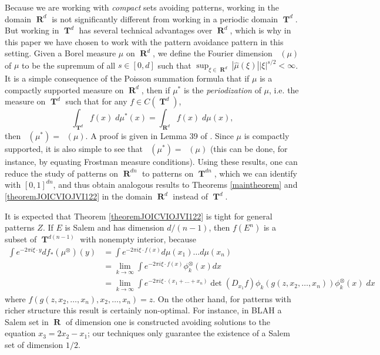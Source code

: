 \documentclass[12pt,reqno]{article}
\numberwithin{equation}{section}
\DeclareMathOperator{\hausdim}{\dim_{\mathbf{H}}}
\DeclareMathOperator{\fordim}{\dim_{\mathbf{F}}}
\DeclareMathOperator{\RR}{\mathbf{R}}
\DeclareMathOperator{\TT}{\mathbf{T}}
\numberwithin{theorem}{section}
\begin{document}
Because we are working with \emph{compact} sets avoiding patterns, working in the domain $\RR^d$ is not significantly different from working in a periodic domain $\TT^d$. But working in $\TT^d$ has several technical advantages over $\RR^d$, which is why in this paper we have chosen to work with the pattern avoidance pattern in this setting. Given a Borel measure $\mu$ on $\RR^d$, we define the Fourier dimension $\fordim(\mu)$ of $\mu$ to be the supremum of all $s \in [0,d]$ such that $\sup_{\xi \in \RR^d} |\widehat{\mu}(\xi)| |\xi|^{s/2} < \infty$. It is a simple consequence of the Poisson summation formula that if $\mu$ is a compactly supported measure on $\RR^d$, then if $\mu^*$ is the \emph{periodization} of $\mu$, i.e. the measure on $\TT^d$ such that for any $f \in C(\TT^d)$,
%
\begin{equation}
    \int_{\TT^d} f(x)\; d\mu^*(x) = \int_{\RR^d} f(x)\; d\mu(x),
\end{equation}
%
then $\fordim(\mu^*) = \fordim(\mu)$. A proof is given in Lemma 39 of \cite{myThesis}. Since $\mu$ is compactly supported, it is also simple to see that $\hausdim(\mu^*) = \hausdim(\mu)$ (this can be done, for instance, by equating Frostman measure conditions). Using these results, one can reduce the study of patterns on $\RR^{dn}$ to patterns on $\TT^{dn}$, which we can identify with $[0,1]^{dn}$, and thus obtain analogous results to Theorems \ref{maintheorem} and \ref{theoremJOICVIOJVI122} in the domain $\RR^d$ instead of $\TT^d$.

It is expected that Theorem \ref{theoremJOICVIOJVI122} is tight for general patterns $Z$. If $E$ is Salem and has dimension $d/(n-1)$, then $f(E^n)$ is a subset of $\TT^{d(n-1)}$ with nonempty interior, because
%
\begin{align*}
    \int e^{-2 \pi i \xi \cdot y} df_*(\mu^{\otimes})(y) &= \int e^{-2 \pi i \xi \cdot f(x)} d\mu(x_1) \dots d\mu(x_n)\\
    &= \lim_{k \to \infty} \int e^{-2 \pi i \xi \cdot f(x)} \phi^{\otimes}_k(x) dx\\
    &= \lim_{k \to \infty} \int e^{-2 \pi i \xi \cdot (x_1 + \dots + x_n)} \det(D_{x_1} f) \phi_k(g(z,x_2,\dots,x_n)) \phi_k^{\otimes}(x)\; dx
\end{align*}
%
where $f(g(z,x_2,\dots,x_n),x_2,\dots,x_n) = z$.
On the other hand, for patterns with richer structure this result is certainly non-optimal. For instance, in BLAH a Salem set in $\RR$ of dimension one is constructed avoiding solutions to the equation $x_3 = 2x_2 - x_1$; our techniques only guarantee the existence of a Salem set of dimension $1/2$.
\end{document}
